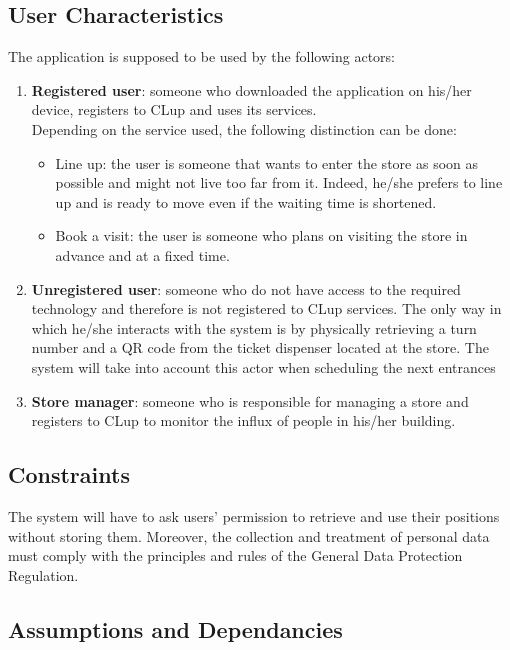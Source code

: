 \documentclass{article}
\begin{document}
\subsection{User Characteristics}
The application is supposed to be used by the following actors:
\begin{enumerate}
\item\textbf{Registered user}: someone who downloaded the application on his/her device, registers to CLup and uses its services.\medskip\\
Depending on the service used, the following distinction can be done: 
\begin{itemize}
\item Line up: the user is someone that wants to enter the store as soon as possible and might not live too far from it. Indeed, he/she prefers to line up and is ready to move even if the waiting time is shortened.
\item Book a visit: the user is someone who plans on visiting the store in advance and at a fixed time.
\end{itemize}
\item\textbf{Unregistered user}: someone who do not have access to the required technology and therefore is not registered to CLup services. The only way in which he/she interacts with the system is by physically retrieving a turn number and a QR code from the ticket dispenser located at the store. The system will take into account this actor when scheduling the next entrances
\item\textbf{Store manager}: someone who is responsible for managing a store and registers to CLup to monitor the influx of people in his/her building.
\end{enumerate}
\subsection{Constraints}
The system will have to ask users' permission to retrieve and use their positions without storing them. Moreover, the collection and treatment of personal data must comply with the principles and rules of the General Data Protection Regulation.
\subsection{Assumptions and Dependancies}
\end{document}
